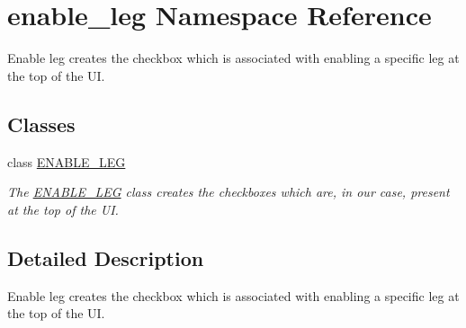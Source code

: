 \hypertarget{namespaceenable__leg}{}\section{enable\+\_\+leg Namespace Reference}
\label{namespaceenable__leg}


Enable leg creates the checkbox which is associated with enabling a specific leg at the top of the UI.  


\subsection*{Classes}
\begin{DoxyCompactItemize}
\item 
class \hyperlink{classenable__leg_1_1ENABLE__LEG}{E\+N\+A\+B\+L\+E\+\_\+\+L\+EG}
\begin{DoxyCompactList}\small\item\em The \hyperlink{classenable__leg_1_1ENABLE__LEG}{E\+N\+A\+B\+L\+E\+\_\+\+L\+EG} class creates the checkboxes which are, in our case, present at the top of the UI. \end{DoxyCompactList}\end{DoxyCompactItemize}


\subsection{Detailed Description}
Enable leg creates the checkbox which is associated with enabling a specific leg at the top of the UI. 

